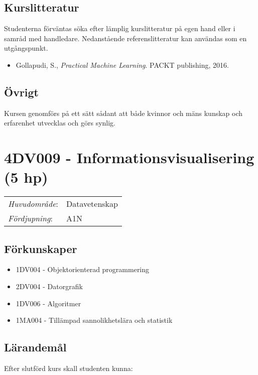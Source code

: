\subsection*{Kurslitteratur}

Studenterna förväntas söka efter lämplig kurslitteratur på egen hand
eller i samråd med handledare. Nedanstående referenslitteratur kan
användas som en utgångspunkt.

\begin{itemize}
\tightlist
\item
  Gollapudi, S., \emph{Practical Machine Learning}. PACKT publishing,
  2016.
\end{itemize}

\subsection*{Övrigt}

Kursen genomförs på ett sätt sådant att både kvinnor och mäns kunskap och erfarenhet utvecklas och görs synlig.
\pagebreak
\section*{4DV009 - Informationsvisualisering (5 hp)}

\begin{tabular}{ll}\emph{Huvudområde}: & Datavetenskap\tabularnewline\emph{Fördjupning}: & A1N\tabularnewline\end{tabular}

\subsection*{Förkunskaper}

\begin{itemize}
\tightlist
\item
  1DV004 - Objektorienterad programmering
\item
  2DV004 - Datorgrafik
\item
  1DV006 - Algoritmer
\item
  1MA004 - Tillämpad sannolikhetslära och statistik
\end{itemize}

\subsection*{Lärandemål}

Efter slutförd kurs skall studenten kunna:

